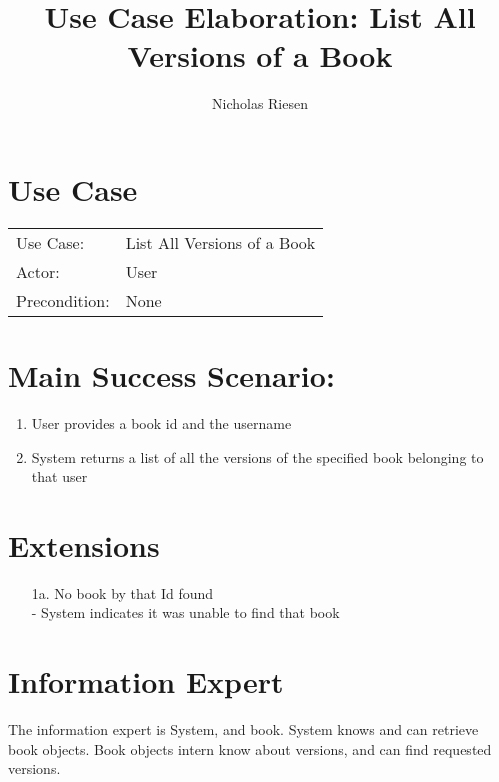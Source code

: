 \documentclass{article}
\title{Use Case Elaboration: List All Versions of a Book}
\author{ Nicholas Riesen }
\begin{document}
\maketitle


\section*{Use Case}
\begin{tabular}{l l}
Use Case:     & List All Versions of a Book\\
Actor:        & User\\
Precondition: & None\\
\end{tabular}


\section*{Main Success Scenario:}

\begin{enumerate}
    \item User provides a book id and the username
    \item System returns a list of all the versions of the specified book belonging to that user
 
\end{enumerate}

\section*{Extensions}

\begin{itemize}
    \item [1a.] No book by that Id found \\
         - System indicates it was unable to find that book
                            
\end{itemize}


\section*{Information Expert}
The information expert is System, and book. System knows and can retrieve book objects. Book objects intern know about versions, and can find requested versions. 
\end{document}
